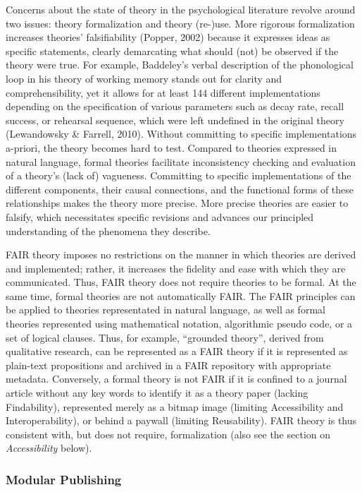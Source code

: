 \documentclass[
  man, noextraspace,floatsintext]{apa6}
\begin{document}
Concerns about the state of theory in the psychological literature revolve around two issues: theory formalization and theory (re-)use.
More rigorous formalization increases theories' falsifiability (Popper, 2002) because it expresses ideas as specific statements, clearly demarcating what should (not) be observed if the theory were true.
For example, Baddeley's verbal description of the phonological loop in his theory of working memory stands out for clarity and comprehensibility, yet it allows for at least 144 different implementations depending on the specification of various parameters such as decay rate, recall success, or rehearsal sequence, which were left undefined in the original theory (Lewandowsky \& Farrell, 2010).
Without committing to specific implementations a-priori,
the theory becomes hard to test.
Compared to theories expressed in natural language,
formal theories facilitate inconsistency checking and evaluation of a theory's (lack of) vagueness.
Committing to specific implementations of the different components, their causal connections, and the functional forms of these relationships makes the theory more precise.
More precise theories are easier to falsify,
which necessitates specific revisions and advances our principled understanding of the phenomena they describe.

FAIR theory imposes no restrictions on the manner in which theories are derived and implemented;
rather, it increases the fidelity and ease with which they are communicated.
Thus, FAIR theory does not require theories to be formal.
At the same time, formal theories are not automatically FAIR.
The FAIR principles
can be applied to theories representated in natural language,
as well as formal theories represented using mathematical notation, algorithmic pseudo code, or a set of logical clauses.
Thus, for example, ``grounded theory'', derived from qualitative research,
can be represented as a FAIR theory if it is represented as plain-text propositions and archived in a FAIR repository with appropriate metadata.
Conversely, a formal theory is not FAIR if it is confined to a journal article without any key words to identify it as a theory paper (lacking Findability), represented merely as a bitmap image (limiting Accessibility and Interoperability), or behind a paywall (limiting Reusability).
FAIR theory is thus consistent with, but does not require, formalization (also see the section on \emph{Accessibility} below).

\subsubsection{Modular Publishing}\label{modular-publishing}
\end{document}
